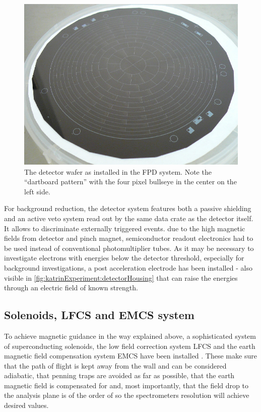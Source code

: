       \begin{figure}
      \centering
      	\includegraphics[width = 0.7 \textwidth]{graphics/katrinExperiment/detectorWafer.jpg}
	  \caption[Detector wafer]{The detector wafer as installed in the FPD system. Note the ``dartboard pattern'' with the four pixel bullseye in the center on the left side.}
	  \label{fig:katrinExperiment:detectorWafer}
      \end{figure}
      
      
      For background reduction, the detector system features both a passive shielding and an active veto system read out by the same data crate as the detector itself. It allows to discriminate externally triggered events. due to the high magnetic fields from detector and pinch magnet, semiconductor readout electronics had to be used instead of conventional photomultiplier tubes.
      As it may be necessary to investigate electrons with energies below the detector threshold, especially for background investigations, a post acceleration electrode has been installed - also visible in \ref{fig:katrinExperiment:detectorHousing} that can raise the energies through an electric field of known strength.
      \subsection{Solenoids, LFCS and EMCS system}
      \label{ch:The KATRIN experiment:sec:Experimental setup:subsec:Solenoids, LFCS and EMCS system}
      
      To achieve magnetic guidance in the way explained above, a sophisticated system of superconducting solenoids, the low field correction system LFCS and the earth magnetic field compensation system EMCS have been installed \cite{airCoilSystem}. These make sure that the path of flight is kept away from the wall and can be considered adiabatic, that penning traps are avoided as far as possible, that the earth magnetic field is compensated for and, most importantly, that the field drop to the analysis plane is of the order of  so the spectrometers resolution will achieve desired values.
      

